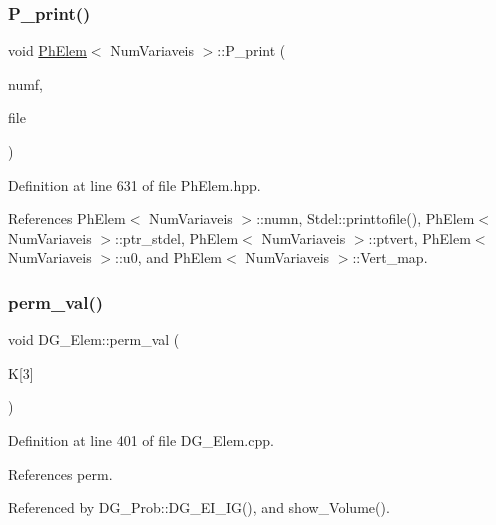 \mbox{\label{classPhElem_a1ae41c2b94f8faca55505d25e899f724}} 
\subsubsection{\texorpdfstring{P\+\_\+print()}{P\_print()}}
{\footnotesize\ttfamily void \hyperlink{classPhElem}{Ph\+Elem}$<$ Num\+Variaveis $>$\+::P\+\_\+print (\begin{DoxyParamCaption}\item[{const int \&}]{numf,  }\item[{F\+I\+LE $\ast$}]{file }\end{DoxyParamCaption})\hspace{0.3cm}{\ttfamily [inherited]}}



Definition at line 631 of file Ph\+Elem.\+hpp.



References Ph\+Elem$<$ Num\+Variaveis $>$\+::numn, Stdel\+::printtofile(), Ph\+Elem$<$ Num\+Variaveis $>$\+::ptr\+\_\+stdel, Ph\+Elem$<$ Num\+Variaveis $>$\+::ptvert, Ph\+Elem$<$ Num\+Variaveis $>$\+::u0, and Ph\+Elem$<$ Num\+Variaveis $>$\+::\+Vert\+\_\+map.

\mbox{\label{classDG__Elem_a699a198b44d02b1394229e623cd6632d}} 
\subsubsection{\texorpdfstring{perm\+\_\+val()}{perm\_val()}}
{\footnotesize\ttfamily void D\+G\+\_\+\+Elem\+::perm\+\_\+val (\begin{DoxyParamCaption}\item[{double}]{K\mbox{[}3\mbox{]} }\end{DoxyParamCaption})}



Definition at line 401 of file D\+G\+\_\+\+Elem.\+cpp.



References perm.



Referenced by D\+G\+\_\+\+Prob\+::\+D\+G\+\_\+\+E\+I\+\_\+\+I\+G(), and show\+\_\+\+Volume().

